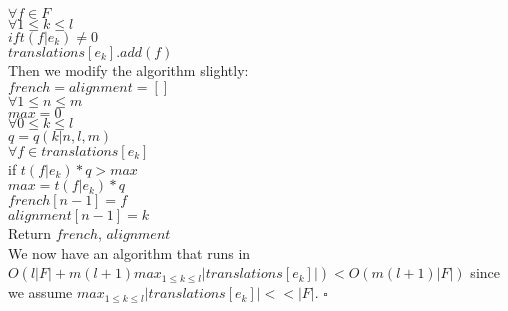 \documentclass[twoside]{homework}
\begin{document}
$\forall f \in F$ \\
\indent $\forall 1 \leq k \leq l$ \\
\indent \indent $if t(f|e_k) \neq 0$ \\
\indent \indent \indent $translations[e_k].add(f)$ \\
Then we modify the algorithm slightly: \\
$french = alignment = [ ]$ \\
$\forall 1 \leq n \leq m$ \\
\indent $max = 0$ \\
\indent $\forall 0 \leq k \leq l$ \\
\indent \indent $q = q(k|n,l,m)$ \\
\indent \indent $\forall f \in translations[e_k]$ \\
\indent \indent \indent if $t(f|e_k) * q > max$ \\
\indent \indent \indent \indent $max = t(f|e_k) * q$ \\
\indent \indent \indent \indent $french[n-1] = f$ \\
\indent \indent \indent \indent $alignment[n-1] = k$ \\
Return $french$, $alignment$ \\
We now have an algorithm that runs in $O(l|F| + m(l+1)max_{1 \leq k \leq l}|translations[e_k]|) < O(m(l+1)|F|)$ since we assume $max_{1 \leq k \leq l}|translations[e_k]| << |F|$.
$\square$
\end{document}
